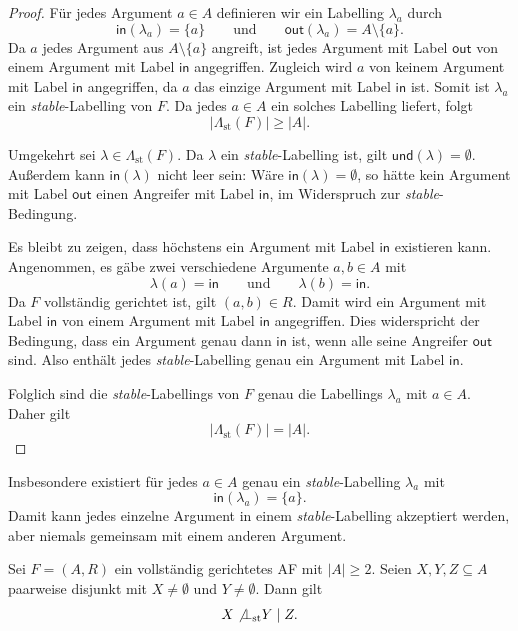 \begin{proof}
    Für jedes Argument \(a\in A\) definieren wir ein Labelling \(\lambda_a\)
    durch
    \[
        \mathsf{in}(\lambda_a)=\{a\}
        \qquad\text{und}\qquad
        \mathsf{out}(\lambda_a)=A\setminus\{a\}.
    \]
    Da \(a\) jedes Argument aus \(A\setminus\{a\}\) angreift, ist jedes
    Argument mit Label \(\mathsf{out}\) von einem Argument mit Label
    \(\mathsf{in}\) angegriffen. Zugleich wird \(a\) von keinem Argument mit
    Label \(\mathsf{in}\) angegriffen, da \(a\) das einzige Argument mit Label
    \(\mathsf{in}\) ist. Somit ist \(\lambda_a\) ein
    \textit{stable}-Labelling von \(F\). Da jedes \(a\in A\) ein solches
    Labelling liefert, folgt
    \[
        |\Lambda_{\mathrm{st}}(F)|\geq |A|.
    \]

    Umgekehrt sei \(\lambda\in\Lambda_{\mathrm{st}}(F)\). Da
    \(\lambda\) ein \textit{stable}-Labelling ist, gilt
    \(\mathsf{und}(\lambda)=\emptyset\). Außerdem kann
    \(\mathsf{in}(\lambda)\) nicht leer sein: Wäre
    \(\mathsf{in}(\lambda)=\emptyset\), so hätte kein Argument mit Label
    \(\mathsf{out}\) einen Angreifer mit Label \(\mathsf{in}\), im Widerspruch
    zur \textit{stable}-Bedingung.

    Es bleibt zu zeigen, dass höchstens ein Argument mit Label
    \(\mathsf{in}\) existieren kann. Angenommen, es gäbe zwei verschiedene
    Argumente \(a,b\in A\) mit
    \[
        \lambda(a)=\mathsf{in}
        \qquad\text{und}\qquad
        \lambda(b)=\mathsf{in}.
    \]
    Da \(F\) vollständig gerichtet ist, gilt \((a,b)\in R\). Damit wird ein
    Argument mit Label \(\mathsf{in}\) von einem Argument mit Label
    \(\mathsf{in}\) angegriffen. Dies widerspricht der Bedingung, dass ein
    Argument genau dann \(\mathsf{in}\) ist, wenn alle seine Angreifer
    \(\mathsf{out}\) sind. Also enthält jedes \textit{stable}-Labelling genau
    ein Argument mit Label \(\mathsf{in}\).

    Folglich sind die \textit{stable}-Labellings von \(F\) genau die
    Labellings \(\lambda_a\) mit \(a\in A\). Daher gilt
    \[
        |\Lambda_{\mathrm{st}}(F)|=|A|.
    \]
\end{proof}

Insbesondere existiert für jedes \(a\in A\) genau ein
\textit{stable}-Labelling \(\lambda_a\) mit
\[
    \mathsf{in}(\lambda_a)=\{a\}.
\]
Damit kann jedes einzelne Argument in einem \textit{stable}-Labelling
akzeptiert werden, aber niemals gemeinsam mit einem anderen Argument.

\begin{Proposition}
    \label{prop:cdg-afs-not-st-ci}
    Sei \(F=(A,R)\) ein vollständig gerichtetes AF mit \(|A|\geq 2\).
    Seien \(X,Y,Z\subseteq A\) paarweise disjunkt mit
    \(X\neq\emptyset\) und \(Y\neq\emptyset\). Dann gilt
    \[
        X\not\bot_{\mathrm{st}}Y\mid Z.
    \]
\end{Proposition}

